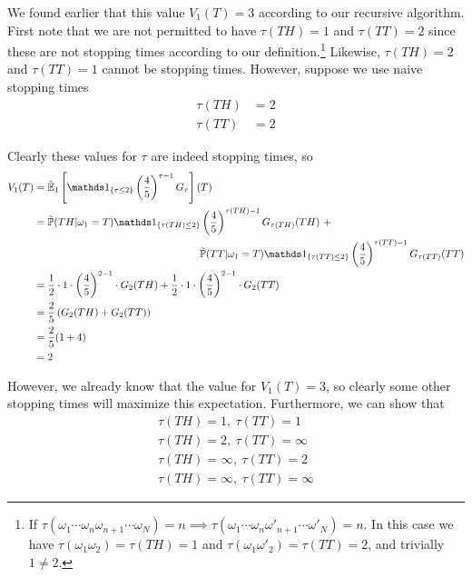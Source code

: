 \documentclass[12pt]{article}
\newlength\tindent
\renewcommand{\indent}{\hspace*{\tindent}}
\renewcommand{\P}{\mathbb P}
\newcommand{\E}{\mathbb E}
\begin{document}
\indent We found earlier that this value $V_1(T) = 3$ according to our recursive algorithm. First note that we are not permitted to have $\tau(TH) = 1$ and $\tau(TT) = 2$ since these are not stopping times according to our definition.\footnote{If $\tau(\omega_1\cdots\omega_n\omega_{n + 1}\cdots\omega_N) = n \implies \tau(\omega_1\cdots\omega_n\omega'_{n + 1}\cdots\omega'_N) = n$. In this case we have $\tau(\omega_1\omega_2) = \tau(TH) = 1$ and $\tau(\omega_1\omega'_2) = \tau(TT) = 2$, and trivially $1 \neq 2$.} Likewise, $\tau(TH) = 2$ and $\tau(TT) = 1$ cannot be stopping times. However, suppose we use naive stopping times
\begin{align*}
	\tau(TH) &= 2 \\
	\tau(TT) &= 2
\end{align*}

Clearly these values for $\tau$ are indeed stopping times, so
\begin{align*}
	V_1(T) &= \tilde{\E}_1 \left[ \mathds 1_{\{\tau \leq 2\}} \left(\frac{4}{5}\right)^{\tau - 1} G_{\tau} \right](T) \\
	&= \tilde{\P}(TH|\omega_1 = T)\mathds 1_{\{\tau(TH) \leq 2\}} \left(\frac{4}{5}\right)^{\tau(TH) - 1}G_{\tau(TH)}(TH)~+  \\
	&\hphantom{{}={---------------}} \tilde{\P}(TT|\omega_1 = T)\mathds 1_{\{\tau(TT) \leq 2\}} \left(\frac{4}{5}\right)^{\tau(TT) - 1}G_{\tau(TT)}(TT) \\
	&= \frac{1}{2}\cdot1\cdot\left(\frac{4}{5}\right)^{2 - 1}\cdot G_2(TH) + \frac{1}{2}\cdot1\cdot\left(\frac{4}{5}\right)^{2 - 1}\cdot G_2(TT) \\
	&= \frac{2}{5}\left( G_2(TH) + G_2(TT)\right)\\
	&= \frac{2}{5}(1 + 4) \\
	&= 2
\end{align*}

\indent However, we already know that the value for $V_1(T) = 3$, so clearly some other stopping times will maximize this expectation. Furthermore, we can show that 
\begin{align*}
	\tau(TH) = 1,~\tau(TT) = 1 \\
	\tau(TH) = 2,~\tau(TT) = \infty \\
	\tau(TH) = \infty,~\tau(TT) = 2 \\
	\tau(TH) = \infty,~\tau(TT) = \infty
\end{align*}
\end{document}
